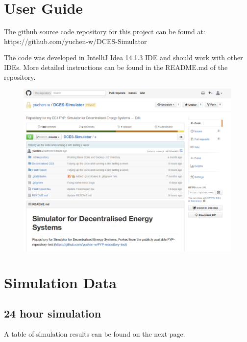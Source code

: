 \begin{appendices}
\label{Appendix}
\chapter{User Guide}
\label{Guide}

The github source code repository for this project can be found at: https://github.com/yuchen-w/DCES-Simulator

The code was developed in IntelliJ Idea 14.1.3 IDE and should work with other IDEs. More detailed instructions can be found in the README.md of the repository.

\begin{figure}[h!]
	\centering
	\includegraphics[scale=0.3]{Images/Github.png}
\end{figure}

\chapter{Simulation Data}
\section{24 hour simulation}
A table of simulation results can be found on the next page.


% 

\end{appendices}